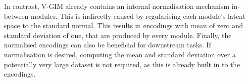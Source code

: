 		In contrast, V-GIM already contains an internal normalisation mechanism in-between modules. This is indirectly caused by regularising each module's latent space to the standard normal. This results in encodings with mean of zero and standard deviation of one, that are produced by every module. Finally, the normalised encodings can also be beneficial for downstream tasks. If normalisation is desired, computing the mean and standard deviation over a potentially very large dataset is not required, as this is already built in to the encodings.

	
	

	






%
%
%		








